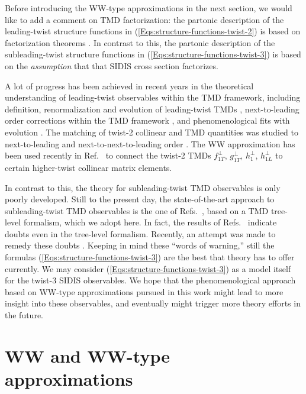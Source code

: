 \documentclass[a4paper,11pt]{article}
\begin{document}
Before introducing the WW-type approximations in the next section,
we would like to add a comment on TMD factorization: the
partonic description of the leading-twist structure functions in
(\ref{Eqs:structure-functions-twist-2}) is based on factorization
theorems \cite{Collins:1981uk,Ji:2004wu,Ji:2004xq,Collins:2011zzd,
Echevarria:2012js}. In contrast to this, the partonic description
of the subleading-twist structure functions in
(\ref{Eqs:structure-functions-twist-3}) is based on the
{\it assumption} that that SIDIS cross section factorizes.

A lot of progress has been achieved in recent years in the
theoretical understanding of leading-twist observables within the TMD
framework, including definition, renormalization and evolution of
leading-twist TMDs
\cite{Aybat:2011zv,Aybat:2011ge,Echevarria:2014xaa,Collins:2014jpa},
next-to-leading order corrections within the TMD framework
\cite{Ma:2013aca}, and phenomenological fits with evolution
\cite{Aybat:2011ta,Kang:2015msa}.
The matching of twist-2 collinear and TMD quantities was
studied to next-to-leading and next-to-next-to-leading order
\cite{Gutierrez-Reyes:2017glx,Gutierrez-Reyes:2018qez}.
The WW approximation has been used recently in Ref.~\cite{Scimemi:2018mmi}
to connect the twist-2 TMDs $f_{1T}^\perp$, $g_{1T}^\perp$, $h_{1}^\perp$,
$h_{1L}^\perp$ to certain higher-twist collinear matrix elements.

In contrast to this, the theory for subleading-twist TMD observables is
only poorly developed. Still to the present day, the state-of-the-art
approach to subleading-twist TMD observables is the one of
Refs.~\cite{Kotzinian:1994dv,Mulders:1995dh,Boer:1997nt,Goeke:2005hb,
Bacchetta:2006tn},
based on a TMD tree-level formalism, which we adopt here.
In fact, the results of Refs.~\cite{Metz:2004je,Gamberg:2006ru}
indicate doubts even in the tree-level formalism.
Recently, an attempt was made to remedy these doubts \cite{Chen:2016hgw}.
Keeping in mind these ``words of warning,'' still the formulas
(\ref{Eqs:structure-functions-twist-3})
are the best that theory has to offer currently. We may consider
(\ref{Eqs:structure-functions-twist-3}) as a model itself for
the twist-3 SIDIS observables. We hope that the phenomenological
approach based on WW-type approximations pursued in this work might
lead to more insight into these observables, and eventually might
trigger more theory efforts in the future.

%
\section{WW and WW-type approximations}
\label{Sec-3:WW}
\end{document}
